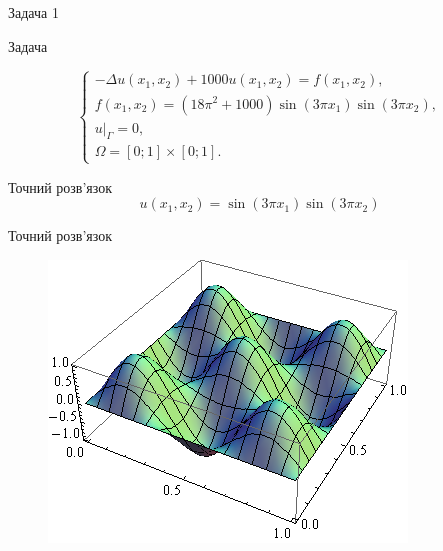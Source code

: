 
\begin{frame}{Задача 1}

		Задача

		\begin{equation}\label{eq:problem1}
		\begin{cases}
			- \Delta u(x_1,x_2) + 1000u(x_1, x_2) = f(x_1,x_2), \\
			f(x_1,x_2) = (18 \pi^2 +1000)\sin(3 \pi x_1) \sin (3 \pi x_2), \\
			u|_\Gamma = 0 ,\\
			\Omega = \left[0;1\right] \times \left[0;1\right].
		\end{cases}
		\end{equation}

		Точний розв'язок
		\begin{equation}
			u(x_1,x_2) = \sin(3 \pi x_1) \sin (3 \pi x_2)
		\end{equation}

\end{frame}

\begin{frame}{Точний розв'язок}
		\begin{figure}[H]
			\centering
		    \includegraphics[scale=0.6]{problem1/ExactSolution}
		    \label{plot:problem1_exact}
		\end{figure}
\end{frame}

